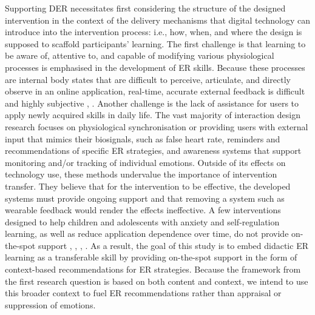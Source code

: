 Supporting DER necessitates first considering the structure of the designed intervention in the context of the delivery mechanisms that digital technology can introduce into the intervention process: i.e., how, when, and where the design is supposed to scaffold participants' learning. The first challenge is that learning to be aware of, attentive to, and capable of modifying various physiological processes is emphasised in the development of ER skills. Because these processes are internal body states that are difficult to perceive, articulate, and directly observe in an online application, real-time, accurate external feedback is difficult and highly subjective \cite{slovak2022designing}, \cite{tag2022emotion}. Another challenge is the lack of assistance for users to apply newly acquired skills in daily life. The vast majority of interaction design research focuses on physiological synchronisation or providing users with external input that mimics their biosignals, such as false heart rate, reminders and recommendations of specific ER strategies, and awareness systems that support monitoring and/or tracking of individual emotions. Outside of its effects on technology use, these methods undervalue the importance of intervention transfer. They believe that for the intervention to be effective, the developed systems must provide ongoing support and that removing a system such as wearable feedback would render the effects ineffective. A few interventions designed to help children and adolescents with anxiety and self-regulation learning, as well as reduce application dependence over time, do not provide on-the-spot support \cite{antle2018opening}, \cite{antle2019design}, \cite{scholten2016randomized}, \cite{slovak2016scaffolding}. As a result, the goal of this study is to embed didactic ER learning as a transferable skill by providing on-the-spot support in the form of context-based recommendations for ER strategies. Because the framework from the first research question is based on both content and context, we intend to use this broader context to fuel ER recommendations rather than appraisal or suppression of emotions.

